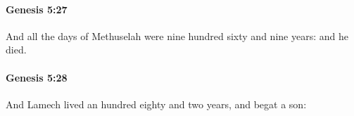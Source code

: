 		\paragraph{Genesis 5:27} %
			\label{GENESIS-5-27}

			And all the days of Methuselah were nine hundred sixty and nine years: and he died.


		\paragraph{Genesis 5:28} %
			\label{GENESIS-5-28}

			And Lamech lived an hundred eighty and two years, and begat a son:


